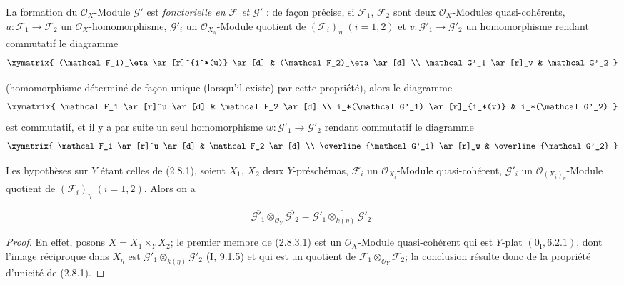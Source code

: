 \begin{env}[2.8.3]
\label{IV.2.8.3-fr}
La formation du $\mathcal O_X$-Module $\overline{\mathcal G'}$ est
\emph{fonctorielle en $\mathcal F$ et $\mathcal G'$} : de façon précise, si
$\mathcal F_1$, $\mathcal F_2$ sont deux $\mathcal O_X$-Modules
quasi-cohérents, $u:\mathcal F_1\to\mathcal F_2$ un
$\mathcal O_X$-homomorphisme, $\mathcal G'_i$ un
$\mathcal O_{X_\eta}$-Module quotient de $(\mathcal F_i)_\eta$ $(i=1,2)$ et
$v:\mathcal G'_1\to\mathcal G'_2$ un homomorphisme rendant commutatif le
diagramme
\[
\xymatrix{
(\mathcal F_1)_\eta \ar[r]^{i^*(u)} \ar[d] &
(\mathcal F_2)_\eta \ar[d] \\
\mathcal G'_1 \ar[r]_v & \mathcal G'_2
}
\]

(homomorphisme déterminé de façon unique (lorsqu'il existe) par cette
propriété), alors le diagramme
\[
\xymatrix{
\mathcal F_1 \ar[r]^u \ar[d] & \mathcal F_2 \ar[d] \\
i_*(\mathcal G'_1) \ar[r]_{i_*(v)} & i_*(\mathcal G'_2)
}
\]
est commutatif, et il y a par suite un seul homomorphisme
$w:\overline{\mathcal G'_1}\to\overline{\mathcal G'_2}$ rendant commutatif
le diagramme
\[
\xymatrix{
\mathcal F_1 \ar[r]^u \ar[d] & \mathcal F_2 \ar[d] \\
\overline{\mathcal G'_1} \ar[r]_w & \overline{\mathcal G'_2}
}
\]
\end{env}

\begin{proposition}[2.8.4]
\label{IV.2.8.4-fr}
Les hypothèses sur $Y$ étant celles de (2.8.1), soient $X_1$, $X_2$ deux
$Y$-préschémas, $\mathcal F_i$ un $\mathcal O_{X_i}$-Module
quasi-cohérent, $\mathcal G'_i$ un $\mathcal O_{(X_i)_\eta}$-Module quotient
de $(\mathcal F_i)_\eta$ $(i=1,2)$. Alors on a
\end{proposition}

\begin{env}[2.8.4.1]
\label{IV.2.8.4.1-fr}
\[
\overline{\mathcal G'_1}\otimes_{\mathcal O_Y}\overline{\mathcal G'_2}
=\overline{\mathcal G'_1\otimes_{k(\eta)}\mathcal G'_2}.
\]
\end{env}

\begin{proof}
En effet, posons $X=X_1\times_Y X_2$; le premier membre de (2.8.3.1) est
un $\mathcal O_X$-Module quasi-cohérent qui est $Y$-plat
$(0_{\mathrm I},6.2.1)$, dont l'image réciproque dans $X_\eta$ est
$\mathcal G'_1\otimes_{k(\eta)}\mathcal G'_2$ (I, 9.1.5) et qui est un
quotient de $\mathcal F_1\otimes_{\mathcal O_Y}\mathcal F_2$; la conclusion
résulte donc de la propriété d'unicité de (2.8.1).
\end{proof}

